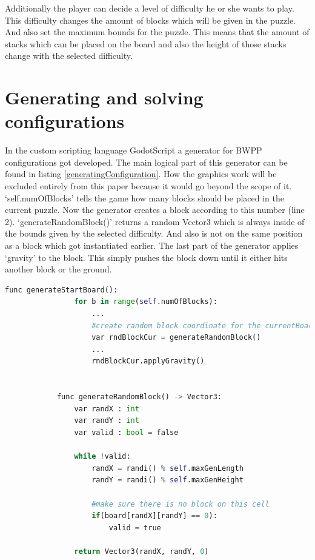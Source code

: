 \documentclass[runningheads]{llncs}
\begin{document}
        Additionally the player can decide a level of difficulty he or she wants to play.
        This difficulty changes the amount of blocks which will be given in the puzzle.
        And also set the maximum bounds for the puzzle.
        This means that the amount of stacks which can be placed on the board and also the height of those stacks change with the selected difficulty.

    \section{Generating and solving configurations}
        In the custom scripting language GodotScript a generator for BWPP configurations got developed.
        The main logical part of this generator can be found in listing \ref{generatingConfiguration}.
        How the graphics work will be excluded entirely from this paper because it would go beyond the scope of it. \newline
        `self.numOfBlocks' tells the game how many blocks should be placed in the current puzzle. 
        Now the generator creates a block according to this number (line 2).
        `generateRandomBlock()' returns a random Vector3 which is always inside of the bounds given by the selected difficulty.
        And also is not on the same position as a block which got instantiated earlier.\newline
        The last part of the generator applies `gravity' to the block.
        This simply pushes the block down until it either hits another block or the ground.

        \begin{lstlisting}[caption=Generating configuration, label=generatingConfiguration, language=python]
            func generateStartBoard():   
                for b in range(self.numOfBlocks):
                    ... 
                    #create random block coordinate for the currentBoard
                    var rndBlockCur = generateRandomBlock() 
                    ...
                    rndBlockCur.applyGravity()


            func generateRandomBlock() -> Vector3:
                var randX : int
                var randY : int
                var valid : bool = false

                while !valid:
                    randX = randi() % self.maxGenLength
                    randY = randi() % self.maxGenHeight
                    
                    #make sure there is no block on this cell
                    if(board[randX][randY] == 0):
                        valid = true

                return Vector3(randX, randY, 0)
        \end{lstlisting}
           
\end{document}
